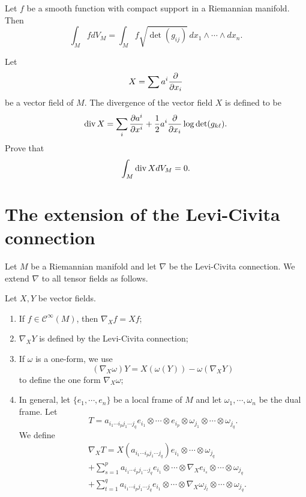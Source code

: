 \begin{definition} Let $f$ be a smooth function with compact support in a Riemannian manifold. Then
\[
\int_M fdV_M=\int_M f\sqrt{\det(g_{ij})} \,dx_1\wedge\cdots\wedge dx_n.
\]
\end{definition}

\begin{ex} Let
\[
X=\sum a^i\frac{\partial}{\partial x_i}
\]
be a vector field of $M$.
The divergence of the vector field $X$ is defined to be
\[
{\rm div}\, X=\sum_i\frac{\partial a^i}{\partial x^i}+\frac 12 a^i\frac{\partial}{\partial x_i}\log\det(g_{k\ell}).
\]
Prove that
\[
\int_M{\rm div}\, X dV_M=0.
\]
\end{ex}

\section{The extension of the Levi-Civita connection}

Let $M$ be a Riemannian manifold and let $\nabla$ be the Levi-Civita connection. We extend $\nabla$ to all tensor fields as follows.

\begin{definition} Let $X,Y$ be vector fields.
\begin{enumerate}
\item If $f\in \mathcal C^\infty(M)$, then $\nabla_X f=Xf$;
\item  $\nabla _XY$ is defined by the Levi-Civita connection;
\item If $\omega$ is a one-form, we use
\[
(\nabla_X\omega)Y=X(\omega(Y))-\omega(\nabla_XY)
\]
 to define the one form $\nabla_X\omega$;
 \item In general, let $\{e_1,\cdots,e_n\}$ be a local frame of $M$ and let $\omega_1,\cdots,\omega_n$ be the dual frame.  Let
  \[
 T=a_{i_1\cdots i_p j_1\cdots j_q}e_{i_1}\otimes\cdots \otimes e_{i_p}\otimes\omega_{j_1}\otimes\cdots\otimes \omega_{j_q}.
 \]
We define
 \begin{align*}
 &\nabla_X T=X(a_{i_1\cdots i_pj_1\cdots j_q})e_{i_1}\otimes\cdots\otimes \omega_{j_q}\\
 &+\sum_{s=1}^p a_{i_1\cdots i_pj_1\cdots j_q}e_{i_1}\otimes\cdots\otimes \nabla_X e_{i_s}\otimes \cdots\otimes \omega_{j_q}\\\
 &+\sum_{t=1}^q a_{i_1\cdots i_pj_1\cdots j_q}e_{i_1}\otimes\cdots\otimes \nabla_X \omega_{j_t}\otimes \cdots\otimes \omega_{j_q}.
 \end{align*}
 \end{enumerate}
 \end{definition}


